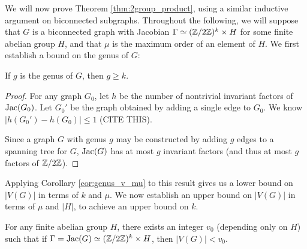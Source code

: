 \documentclass{amsart}
\begin{document}
We will now prove Theorem \ref{thm:2group_product}, using a similar
inductive argument on biconnected subgraphs. Throughout the following,
we will suppose that $G$ is a biconnected graph with Jacobian $\Gamma
\simeq (\mathbb{Z}/2\mathbb{Z})^k \times H$ for some finite abelian group $H$, and
that $\mu$ is the maximum order of an element of $H$. We first
establish a bound on the genus of $G$:

\begin{lem}
  \label{lem:genus_cycle}
  If $g$ is the genus of $G$, then $g \ge k$.
\end{lem}
\begin{proof}
  For any graph $G_0$, let $h$ be the number of nontrivial invariant
  factors of $\operatorname{Jac}(G_0)$. Let $G_0'$ be the graph obtained by adding a
  single edge to $G_0$. We know $|h(G_0') - h(G_0)| \le 1$ (CITE
  THIS). 

  Since a graph $G$ with genus $g$ may be constructed by adding $g$ edges
  to a spanning tree for $G$, $\operatorname{Jac}(G)$ has at most $g$ invariant
  factors (and thus at most $g$ factors of $\mathbb{Z}/2\mathbb{Z}$). 
\end{proof}

Applying Corollary \ref{cor:genus_v_mu} to this result gives us a
lower bound on $|V(G)|$ in terms of $k$ and $\mu$. We now establish an
upper bound on $|V(G)|$ in terms of $\mu$ and $|H|$, to achieve an
upper bound on $k$.

\begin{prop}
  \label{prop:v_bound}
  For any finite abelian group $H$, there exists an integer $v_0$
  (depending only on $H$) such that if $\Gamma = \operatorname{Jac}(G) \simeq (\mathbb{Z}/2\mathbb{Z})^k
  \times H$, then $|V(G)| < v_0$.
\end{prop}
\end{document}
